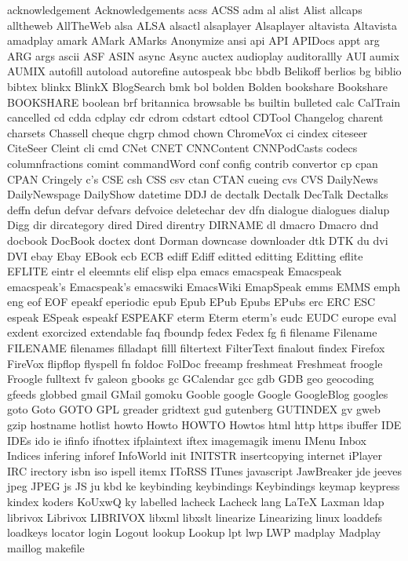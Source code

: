 acknowledgement
Acknowledgements
acss
ACSS
adm
al
alist
Alist
allcaps
alltheweb
AllTheWeb
alsa
ALSA
alsactl
alsaplayer
Alsaplayer
altavista
Altavista
amadplay
amark
AMark
AMarks
Anonymize
ansi
api
API
APIDocs
appt
arg
ARG
args
ascii
ASF
ASIN
async
Async
auctex
audioplay
auditorallly
AUI
aumix
AUMIX
autofill
autoload
autorefine
autospeak
bbc
bbdb
Belikoff
berlios
bg
biblio
bibtex
blinkx
BlinkX
BlogSearch
bmk
bol
bolden
Bolden
bookshare
Bookshare
BOOKSHARE
boolean
brf
britannica
browsable
bs
builtin
bulleted
calc
CalTrain
cancelled
cd
cdda
cdplay
cdr
cdrom
cdstart
cdtool
CDTool
Changelog
charent
charsets
Chassell
cheque
chgrp
chmod
chown
ChromeVox
ci
cindex
citeseer
CiteSeer
Cleint
cli
cmd
CNet
CNET
CNNContent
CNNPodCasts
codecs
columnfractions
comint
commandWord
conf
config
contrib
convertor
cp
cpan
CPAN
Cringely
c's
CSE
csh
CSS
csv
ctan
CTAN
cueing
cvs
CVS
DailyNews
DailyNewspage
DailyShow
datetime
DDJ
de
dectalk
Dectalk
DecTalk
Dectalks
deffn
defun
defvar
defvars
defvoice
deletechar
dev
dfn
dialogue
dialogues
dialup
Digg
dir
dircategory
dired
Dired
direntry
DIRNAME
dl
dmacro
Dmacro
dnd
docbook
DocBook
doctex
dont
Dorman
downcase
downloader
dtk
DTK
du
dvi
DVI
ebay
Ebay
EBook
ecb
ECB
ediff
Ediff
editted
editting
Editting
eflite
EFLITE
eintr
el
eleemnts
elif
elisp
elpa
emacs
emacspeak
Emacspeak
emacspeak's
Emacspeak's
emacswiki
EmacsWiki
EmapSpeak
emms
EMMS
emph
eng
eof
EOF
epeakf
eperiodic
epub
Epub
EPub
Epubs
EPubs
erc
ERC
ESC
espeak
ESpeak
espeakf
ESPEAKF
eterm
Eterm
eterm's
eudc
EUDC
europe
eval
exdent
exorcized
extendable
faq
fboundp
fedex
Fedex
fg
fi
filename
Filename
FILENAME
filenames
filladapt
filll
filtertext
FilterText
finalout
findex
Firefox
FireVox
flipflop
flyspell
fn
foldoc
FolDoc
freeamp
freshmeat
Freshmeat
froogle
Froogle
fulltext
fv
galeon
gbooks
gc
GCalendar
gcc
gdb
GDB
geo
geocoding
gfeeds
globbed
gmail
GMail
gomoku
Gooble
google
Google
GoogleBlog
googles
goto
Goto
GOTO
GPL
greader
gridtext
gud
gutenberg
GUTINDEX
gv
gweb
gzip
hostname
hotlist
howto
Howto
HOWTO
Howtos
html
http
https
ibuffer
IDE
IDEs
ido
ie
ifinfo
ifnottex
ifplaintext
iftex
imagemagik
imenu
IMenu
Inbox
Indices
infering
inforef
InfoWorld
init
INITSTR
insertcopying
internet
iPlayer
IRC
irectory
isbn
iso
ispell
itemx
IToRSS
ITunes
javascript
JawBreaker
jde
jeeves
jpeg
JPEG
js
JS
ju
kbd
ke
keybinding
keybindings
Keybindings
keymap
keypress
kindex
koders
KoUxwQ
ky
labelled
lacheck
Lacheck
lang
LaTeX
Laxman
ldap
librivox
Librivox
LIBRIVOX
libxml
libxslt
linearize
Linearizing
linux
loaddefs
loadkeys
locator
login
Logout
lookup
Lookup
lpt
lwp
LWP
madplay
Madplay
maillog
makefile
